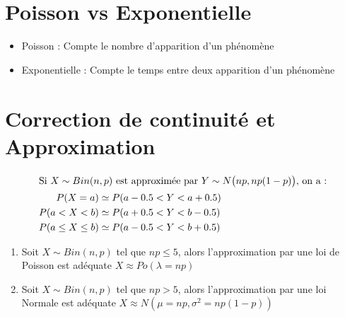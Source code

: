 \documentclass{article}
\begin{document}
	\section*{Poisson vs Exponentielle}
		\begin{itemize}
			\item Poisson : Compte le nombre d'apparition d'un phénomène
			\item Exponentielle : Compte le temps entre deux apparition d'un phénomène
		\end{itemize}
	\addtocounter{footnote}{-1}
	\addtocounter{footnote}{1}
	\addtocounter{footnote}{1}
	\addtocounter{footnote}{1}
	\section*{Correction de continuité et Approximation}
	\begin{align*}
		\intertext{Si \(X\sim Bin(n,p)\) est approximée par \(Y\sim N\big(np,np(1-p)\big)\), on a :}
		P(X=a)           & \simeq P(a-0.5<Y<a+0.5) \\
		P(a<X<b)         & \simeq P(a+0.5<Y<b-0.5) \\
		P(a\leq X\leq b) & \simeq P(a-0.5<Y<b+0.5)
	\end{align*}
	\begin{enumerate}
		\item Soit \(X\sim Bin(n,p)\) tel que \(np\leq 5\), alors l'approximation par une loi de Poisson est adéquate \(X\approx Po(\lambda=np)\)
		\item Soit \(X\sim Bin(n,p)\) tel que \(np>5\), alors l'approximation par une loi Normale est adéquate \(X\approx N(\mu=np,\sigma^2=np(1-p))\)
	\end{enumerate}
\end{document}
